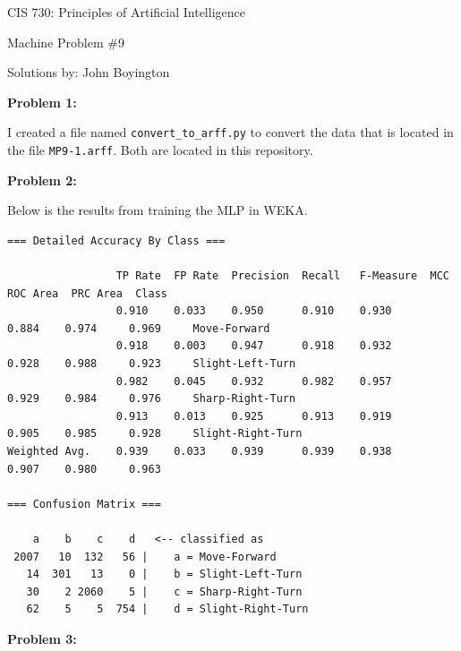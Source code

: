 \documentclass{amsart}
\theoremstyle{definition}
\begin{document}
\LARGE{CIS 730: Principles of Artificial Intelligence}
 
\large
Machine Problem \#9
 
Solutions by: John Boyington
\newline
\bigskip



\textbf{Problem 1:}
\bigbreak

I created a file named {\tt convert\_to\_arff.py} to convert the data that is located in the file {\tt MP9-1.arff}.
Both are located in this repository.


\bigbreak
\textbf{Problem 2:}
\bigbreak


Below is the results from training the MLP in WEKA.
\begin{Verbatim}[fontsize=\small]
=== Detailed Accuracy By Class ===

                 TP Rate  FP Rate  Precision  Recall   F-Measure  MCC      ROC Area  PRC Area  Class
                 0.910    0.033    0.950      0.910    0.930      0.884    0.974     0.969     Move-Forward
                 0.918    0.003    0.947      0.918    0.932      0.928    0.988     0.923     Slight-Left-Turn
                 0.982    0.045    0.932      0.982    0.957      0.929    0.984     0.976     Sharp-Right-Turn
                 0.913    0.013    0.925      0.913    0.919      0.905    0.985     0.928     Slight-Right-Turn
Weighted Avg.    0.939    0.033    0.939      0.939    0.938      0.907    0.980     0.963     

=== Confusion Matrix ===

    a    b    c    d   <-- classified as
 2007   10  132   56 |    a = Move-Forward
   14  301   13    0 |    b = Slight-Left-Turn
   30    2 2060    5 |    c = Sharp-Right-Turn
   62    5    5  754 |    d = Slight-Right-Turn
\end{Verbatim}


\bigbreak
\textbf{Problem 3:}
\bigbreak
\end{document}
